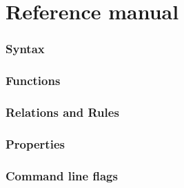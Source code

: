 \section{Reference manual}\label{reference-manual}

\subsubsection{Syntax}\label{syntax}

\subsubsection{Functions}\label{functions}

\subsubsection{Relations and Rules}\label{relations-and-rules}

\subsubsection{Properties}\label{properties}

\subsubsection{Command line flags}\label{command-line-flags}
